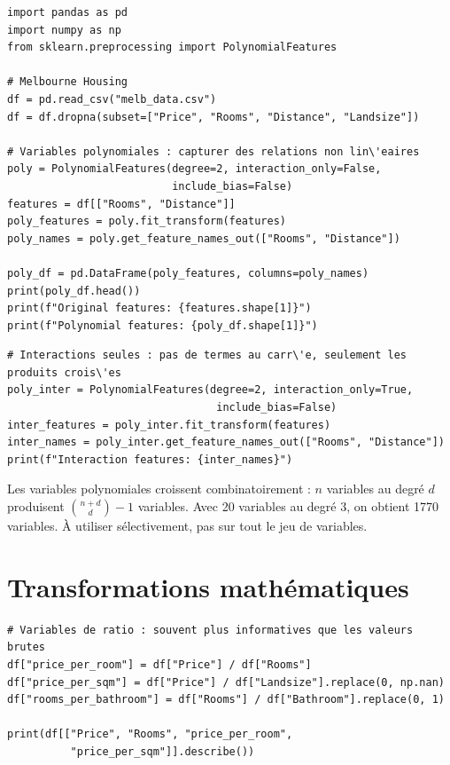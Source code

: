 \begin{verbatim}
import pandas as pd
import numpy as np
from sklearn.preprocessing import PolynomialFeatures

# Melbourne Housing
df = pd.read_csv("melb_data.csv")
df = df.dropna(subset=["Price", "Rooms", "Distance", "Landsize"])

# Variables polynomiales : capturer des relations non lin\'eaires
poly = PolynomialFeatures(degree=2, interaction_only=False,
                          include_bias=False)
features = df[["Rooms", "Distance"]]
poly_features = poly.fit_transform(features)
poly_names = poly.get_feature_names_out(["Rooms", "Distance"])

poly_df = pd.DataFrame(poly_features, columns=poly_names)
print(poly_df.head())
print(f"Original features: {features.shape[1]}")
print(f"Polynomial features: {poly_df.shape[1]}")
\end{verbatim}

\begin{verbatim}
# Interactions seules : pas de termes au carr\'e, seulement les produits crois\'es
poly_inter = PolynomialFeatures(degree=2, interaction_only=True,
                                 include_bias=False)
inter_features = poly_inter.fit_transform(features)
inter_names = poly_inter.get_feature_names_out(["Rooms", "Distance"])
print(f"Interaction features: {inter_names}")
\end{verbatim}

\begin{warningbox}
Les variables polynomiales croissent combinatoirement : $n$ variables au degr\'e $d$ produisent $\binom{n+d}{d} - 1$ variables. Avec 20 variables au degr\'e 3, on obtient 1770 variables. \`A utiliser s\'electivement, pas sur tout le jeu de variables.
\end{warningbox}

\section{Transformations math\'ematiques}

\begin{verbatim}
# Variables de ratio : souvent plus informatives que les valeurs brutes
df["price_per_room"] = df["Price"] / df["Rooms"]
df["price_per_sqm"] = df["Price"] / df["Landsize"].replace(0, np.nan)
df["rooms_per_bathroom"] = df["Rooms"] / df["Bathroom"].replace(0, 1)

print(df[["Price", "Rooms", "price_per_room",
          "price_per_sqm"]].describe())
\end{verbatim}

